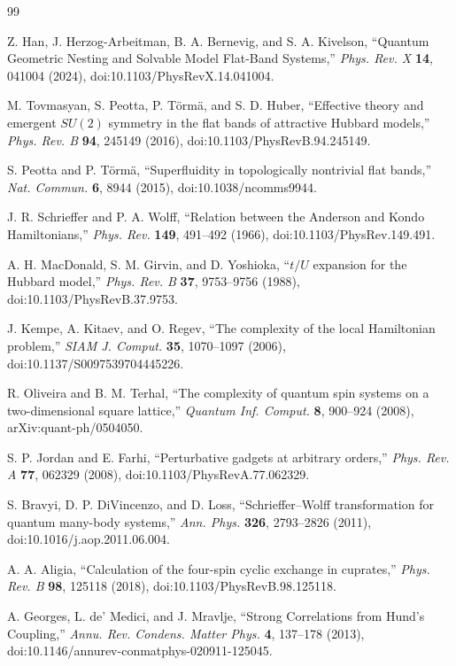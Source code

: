 \documentclass[11pt]{article}
\theoremstyle{definition}
\theoremstyle{remark}
\begin{document}
\begin{thebibliography}{99}

Z. Han, J. Herzog-Arbeitman, B. A. Bernevig, and S. A. Kivelson,
``Quantum Geometric Nesting and Solvable Model Flat-Band Systems,''
\emph{Phys. Rev. X} \textbf{14}, 041004 (2024),
doi:10.1103/PhysRevX.14.041004.

M. Tovmasyan, S. Peotta, P. T\"orm\"a, and S. D. Huber,
``Effective theory and emergent $SU(2)$ symmetry in the flat bands of attractive Hubbard models,''
\emph{Phys. Rev. B} \textbf{94}, 245149 (2016),
doi:10.1103/PhysRevB.94.245149.

S. Peotta and P. T\"orm\"a,
``Superfluidity in topologically nontrivial flat bands,''
\emph{Nat. Commun.} \textbf{6}, 8944 (2015),
doi:10.1038/ncomms9944.

J. R. Schrieffer and P. A. Wolff,
``Relation between the Anderson and Kondo Hamiltonians,''
\emph{Phys. Rev.} \textbf{149}, 491--492 (1966),
doi:10.1103/PhysRev.149.491.

A. H. MacDonald, S. M. Girvin, and D. Yoshioka,
``$t/U$ expansion for the Hubbard model,''
\emph{Phys. Rev. B} \textbf{37}, 9753--9756 (1988),
doi:10.1103/PhysRevB.37.9753.

J. Kempe, A. Kitaev, and O. Regev,
``The complexity of the local Hamiltonian problem,''
\emph{SIAM J. Comput.} \textbf{35}, 1070--1097 (2006),
doi:10.1137/S0097539704445226.

R. Oliveira and B. M. Terhal,
``The complexity of quantum spin systems on a two-dimensional square lattice,''
\emph{Quantum Inf. Comput.} \textbf{8}, 900--924 (2008),
arXiv:quant-ph/0504050.

S. P. Jordan and E. Farhi,
``Perturbative gadgets at arbitrary orders,''
\emph{Phys. Rev. A} \textbf{77}, 062329 (2008),
doi:10.1103/PhysRevA.77.062329.

S. Bravyi, D. P. DiVincenzo, and D. Loss,
``Schrieffer--Wolff transformation for quantum many-body systems,''
\emph{Ann. Phys.} \textbf{326}, 2793--2826 (2011),
doi:10.1016/j.aop.2011.06.004.

A. A. Aligia,
``Calculation of the four-spin cyclic exchange in cuprates,''
\emph{Phys. Rev. B} \textbf{98}, 125118 (2018),
doi:10.1103/PhysRevB.98.125118.

A. Georges, L. de' Medici, and J. Mravlje,
``Strong Correlations from Hund's Coupling,''
\emph{Annu. Rev. Condens. Matter Phys.} \textbf{4}, 137--178 (2013),
doi:10.1146/annurev-conmatphys-020911-125045.


\end{thebibliography}
\end{document}
